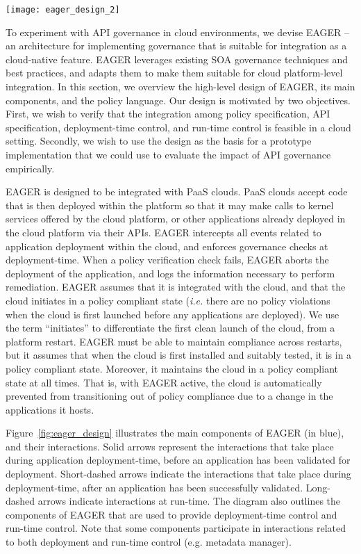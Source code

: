 \begin{figure*}[t]
\centering
\texttt{[image: eager\_design\_2]}
\caption{EAGER Architecture
\label{fig:eager_design}
}
\end{figure*}

To experiment with API governance in cloud environments, we devise EAGER
-- an architecture for implementing governance that is suitable for integration
as a cloud-native feature.
EAGER leverages existing SOA governance techniques and 
best practices, and adapts them to make them
suitable for cloud platform-level integration.
In this section, we
overview the high-level design of EAGER, its main
components, and the policy language.  Our design is motivated by two objectives.
First, we wish to verify that the integration among policy specification,
API specification,
deployment-time control, and run-time control is feasible in a cloud setting.
Secondly, we wish to use the design as the basis for a prototype
implementation that we could use to evaluate the impact of API governance
empirically.

EAGER is designed to be integrated with PaaS clouds. 
PaaS clouds accept code that is then
deployed within the platform so that it may make calls to kernel services
offered by the cloud platform, or other applications already
deployed in the cloud platform via their APIs.
EAGER intercepts all events related to application 
deployment within the cloud,
and enforces governance checks at deployment-time. 
When a policy verification check fails, 
EAGER aborts the deployment of the application, and logs the information
necessary to perform remediation.  EAGER assumes that it is integrated with
the cloud, and that the cloud initiates 
in a policy compliant state ({\em i.e.} there are
no policy violations when the cloud is first launched before any applications are
deployed).  
We use the term
``initiates'' to differentiate the first clean launch of the cloud, from
a platform restart.  EAGER must be able to maintain compliance across restarts,
but it assumes that when the cloud is first installed and suitably tested, it is in
a policy compliant state.
Moreover, it maintains the cloud
in a policy compliant state at all times.  That is, with EAGER active, the cloud
is automatically prevented from transitioning out of policy compliance due to a
change in the applications it hosts.

Figure~\ref{fig:eager_design} illustrates the main components of EAGER (in
blue), and their interactions. Solid arrows represent the interactions that take place
during application deployment-time, before an application has been validated
for deployment. Short-dashed arrows indicate the interactions that take place
during deployment-time, after an application has been successfully validated.
Long-dashed arrows indicate interactions at run-time. The diagram also outlines the
components of EAGER that are used to provide deployment-time  control and run-time control.
Note that some components participate in interactions related to both deployment and
run-time control (e.g. metadata manager).

